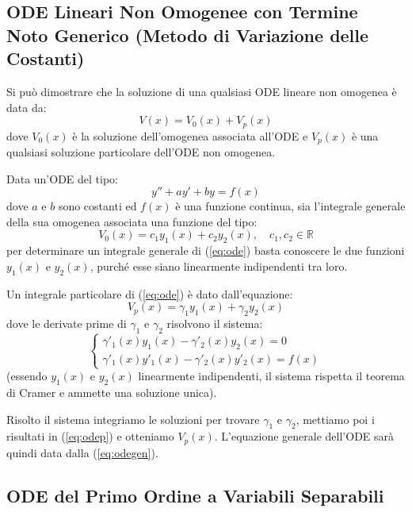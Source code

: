\documentclass[a4paper,11pt]{article}
\begin{document}
\subsection[Metodo di Variazione delle Costanti]{ODE Lineari Non Omogenee con Termine Noto Generico (Metodo di Variazione delle Costanti)}
Si può dimostrare che la soluzione di una qualsiasi ODE lineare non omogenea è data da:
\begin{equation}\label{eq:odegen}
    V(x)=V_0(x)+V_p(x)
\end{equation}
dove $V_0(x)$ è la soluzione dell'omogenea associata all'ODE e $V_p(x)$ è una qualsiasi soluzione particolare dell'ODE non omogenea.

Data un'ODE del tipo:
\begin{equation}\label{eq:ode}
    y'' + ay' + by = f(x)
\end{equation}
dove $a$ e $b$ sono costanti ed $f(x)$ è una funzione continua, sia l'integrale generale della sua omogenea associata una funzione del tipo:
\begin{equation*}
    V_0(x) = c_1y_1(x) + c_2y_2(x), \quad c_1, c_2 \in \mathbb{R}
\end{equation*}
per determinare un integrale generale di (\ref{eq:ode}) basta conoscere le due funzioni $y_1(x)$ e $y_2(x)$, purché esse siano linearmente indipendenti tra loro.

Un integrale particolare di (\ref{eq:ode}) è dato dall'equazione:
\begin{equation}\label{eq:odep}
    V_p(x) = \gamma_1y_1(x) + \gamma_2y_2(x)
\end{equation}
dove le derivate prime di $\gamma_1$ e $\gamma_2$ risolvono il sistema:
\begin{equation*}
    \begin{cases}
        \gamma'_1(x)y_1(x) - \gamma'_2(x)y_2(x) = 0 \\
        \gamma'_1(x)y'_1(x) - \gamma'_2(x)y'_2(x) = f(x)
    \end{cases}
\end{equation*}
(essendo $y_1(x)$ e $y_2(x)$ linearmente indipendenti, il sistema rispetta il teorema di Cramer e ammette una soluzione unica).

Risolto il sistema integriamo le soluzioni per trovare $\gamma_1$ e $\gamma_2$, mettiamo poi i risultati in (\ref{eq:odep}) e otteniamo $V_p(x)$.
L'equazione generale dell'ODE sarà quindi data dalla (\ref{eq:odegen}).

\subsection[Equazioni a Variabili Separabili]{ODE del Primo Ordine a Variabili Separabili}
\end{document}
